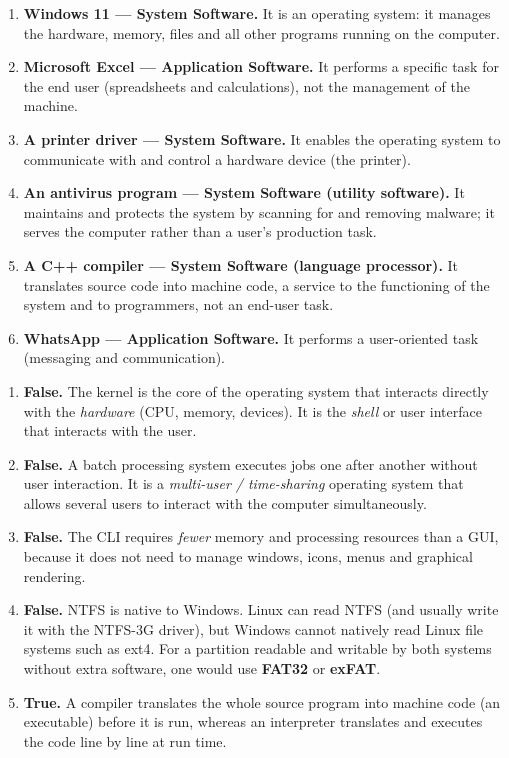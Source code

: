 \documentclass[11pt]{article}
\newcommand{\cle}[1]{{\popxbold\color{popdark}#1}}
\begin{document}
\begin{corrige}
\begin{enumerate}
\item \textbf{Windows 11 — System Software.} It is an operating system: it manages the hardware, memory, files and all other programs running on the computer.
\item \textbf{Microsoft Excel — Application Software.} It performs a specific task for the end user (spreadsheets and calculations), not the management of the machine.
\item \textbf{A printer driver — System Software.} It enables the operating system to communicate with and control a hardware device (the printer).
\item \textbf{An antivirus program — System Software (utility software).} It maintains and protects the system by scanning for and removing malware; it serves the computer rather than a user's production task.
\item \textbf{A C++ compiler — System Software (language processor).} It translates source code into machine code, a service to the functioning of the system and to programmers, not an end-user task.
\item \textbf{WhatsApp — Application Software.} It performs a user-oriented task (messaging and communication).
\end{enumerate}
\end{corrige}

\begin{corrige}
\begin{enumerate}
\item \textbf{False.} The \cle{kernel} is the core of the operating system that interacts directly with the \emph{hardware} (CPU, memory, devices). It is the \emph{shell} or user interface that interacts with the user.
\item \textbf{False.} A batch processing system executes jobs one after another without user interaction. It is a \emph{multi-user / time-sharing} operating system that allows several users to interact with the computer simultaneously.
\item \textbf{False.} The CLI requires \emph{fewer} memory and processing resources than a GUI, because it does not need to manage windows, icons, menus and graphical rendering.
\item \textbf{False.} NTFS is native to Windows. Linux can read NTFS (and usually write it with the NTFS-3G driver), but Windows cannot natively read Linux file systems such as ext4. For a partition readable and writable by both systems without extra software, one would use \textbf{FAT32} or \textbf{exFAT}.
\item \textbf{True.} A compiler translates the whole source program into machine code (an executable) before it is run, whereas an interpreter translates and executes the code line by line at run time.
\end{enumerate}
\end{corrige}
\end{document}
